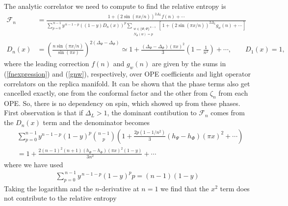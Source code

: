 \documentclass[11pt]{article}
\newcommand{\nn}{\nonumber}
\newcommand{\lb}{\left(}
\newcommand{\rb}{\right)}
\newcommand{\JM}[1]{\textcolor{orange}{#1}}
\begin{document}
  The analytic correlator we need to compute to find the relative entropy is
  \begin{align}
    \label{eq:F_n_mixed}\mathcal{F}_{n} & =\frac{\,1+(2\sin(\pi x/n))^{2\Delta_L}f(n)+\cdots\,}{\displaystyle \sum_{p=0}^{\,n-1}y^{\,n-1-p}((1-y)D_n(x))^{p}\sum_{\substack{w\in\{\Psi,\Phi\}^{\,n-1}\\ N_\Phi(w)=p}}\left[\,1+(2\sin(\pi x/n))^{2\Delta_L}g_{w}(n)+\cdots\,\right] }\\
    \label{Dn_mixed}
    D_{n}(x)&=\left(\frac{n\sin(\pi x/n)}{\sin(\pi x)}\right)^{2(\Delta_\Psi-\Delta_\Phi)}\simeq 1+\frac{(\Delta_\Psi-\Delta_\Phi)(\pi x)^2}{3}\lb 1-\frac{1}{n^2}\rb+\cdots 
    ,\qquad D_{1}(x)=1,
  \end{align}
  where the leading correction $f(n)$ and $g_w(n)$ are given by the sums in (\ref{fnexpression}) and (\ref{gnw}), respectively, over OPE coefficients and light operator correlators on the replica manifold. It can be shown that the phase terms also get cancelled exactly, one from the conformal factor and the other from $\zeta_n$ from each OPE. So, there is no dependency on spin, which showed up from these phases. First observation is that if $\Delta_L> 1$, the dominant contibution to $\mathcal{F}_n$ comes from the $D_n(x)$ term and the denominator becomes 
  \begin{align}
    &\sum_{p=0}^{n-1} y^{n-1-p}(1-y)^p\binom{n-1}{p}\lb 1+\frac{2p(1-1/n^2)}{3}(h_\Psi-h_\Phi)(\pi x)^2+\cdots\rb\nn\\
    &=1+\frac{2(n-1)^2(n+1)(h_\Psi-h_\Phi)(\pi x)^2(1-y)}{3n^2}+\cdots 
  \end{align}
  where we have used 
  \begin{align}
  \sum_{p=0}^{\,n-1}y^{\,n-1-p}(1-y)^{p}p = (n-1)(1-y)
  \end{align}
Taking the logarithm and the $n$-derivative at $n=1$ we find that the $x^2$ term does not contribute to the relative entropy
\end{document}
